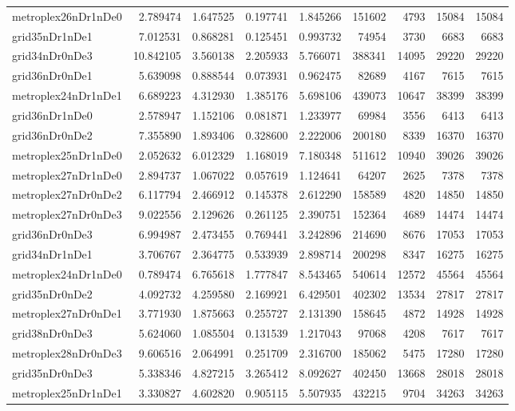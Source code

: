 \begin{longtable}{|l|r|r|r|r|r|r|r|r|}
metroplex26nDr1nDe0 & 2.789474 & 1.647525 & 0.197741 & 1.845266 & 151602 & 4793 & 15084 & 15084 \\
grid35nDr1nDe1 & 7.012531 & 0.868281 & 0.125451 & 0.993732 & 74954 & 3730 & 6683 & 6683 \\
grid34nDr0nDe3 & 10.842105 & 3.560138 & 2.205933 & 5.766071 & 388341 & 14095 & 29220 & 29220 \\
grid36nDr0nDe1 & 5.639098 & 0.888544 & 0.073931 & 0.962475 & 82689 & 4167 & 7615 & 7615 \\
metroplex24nDr1nDe1 & 6.689223 & 4.312930 & 1.385176 & 5.698106 & 439073 & 10647 & 38399 & 38399 \\
grid36nDr1nDe0 & 2.578947 & 1.152106 & 0.081871 & 1.233977 & 69984 & 3556 & 6413 & 6413 \\
grid36nDr0nDe2 & 7.355890 & 1.893406 & 0.328600 & 2.222006 & 200180 & 8339 & 16370 & 16370 \\
metroplex25nDr1nDe0 & 2.052632 & 6.012329 & 1.168019 & 7.180348 & 511612 & 10940 & 39026 & 39026 \\
metroplex27nDr1nDe0 & 2.894737 & 1.067022 & 0.057619 & 1.124641 & 64207 & 2625 & 7378 & 7378 \\
metroplex27nDr0nDe2 & 6.117794 & 2.466912 & 0.145378 & 2.612290 & 158589 & 4820 & 14850 & 14850 \\
metroplex27nDr0nDe3 & 9.022556 & 2.129626 & 0.261125 & 2.390751 & 152364 & 4689 & 14474 & 14474 \\
grid36nDr0nDe3 & 6.994987 & 2.473455 & 0.769441 & 3.242896 & 214690 & 8676 & 17053 & 17053 \\
grid34nDr1nDe1 & 3.706767 & 2.364775 & 0.533939 & 2.898714 & 200298 & 8347 & 16275 & 16275 \\
metroplex24nDr1nDe0 & 0.789474 & 6.765618 & 1.777847 & 8.543465 & 540614 & 12572 & 45564 & 45564 \\
grid35nDr0nDe2 & 4.092732 & 4.259580 & 2.169921 & 6.429501 & 402302 & 13534 & 27817 & 27817 \\
metroplex27nDr0nDe1 & 3.771930 & 1.875663 & 0.255727 & 2.131390 & 158645 & 4872 & 14928 & 14928 \\
grid38nDr0nDe3 & 5.624060 & 1.085504 & 0.131539 & 1.217043 & 97068 & 4208 & 7617 & 7617 \\
metroplex28nDr0nDe3 & 9.606516 & 2.064991 & 0.251709 & 2.316700 & 185062 & 5475 & 17280 & 17280 \\
grid35nDr0nDe3 & 5.338346 & 4.827215 & 3.265412 & 8.092627 & 402450 & 13668 & 28018 & 28018 \\
metroplex25nDr1nDe1 & 3.330827 & 4.602820 & 0.905115 & 5.507935 & 432215 & 9704 & 34263 & 34263 \\

\end{longtable}
